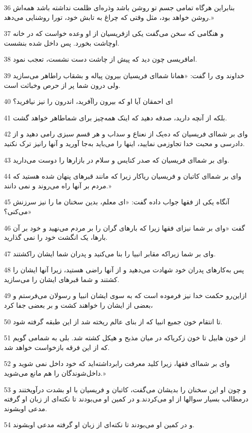 \par 36 بنابراین هرگاه تمامی جسم تو روشن باشد وذره‌ای ظلمت نداشته باشد همه‌اش روشن خواهد بود، مثل وقتی که چراغ به تابش خود، تورا روشنایی می‌دهد.»
\par 37 و هنگامی که سخن می‌گفت یکی ازفریسیان از او وعده خواست که در خانه اوچاشت بخورد. پس داخل شده بنشست.
\par 38 امافریسی چون دید که پیش از چاشت دست نشست، تعجب نمود.
\par 39 خداوند وی را گفت: «همانا شما‌ای فریسیان بیرون پیاله و بشقاب راطاهر می‌سازید ولی درون شما پر از حرص وخباثت است.
\par 40 ‌ای احمقان آیا او که بیرون راآفرید، اندرون را نیز نیافرید؟
\par 41 بلکه از آنچه دارید، صدقه دهید که اینک همه‌چیز برای شماطاهر خواهد گشت.
\par 42 وای بر شما‌ای فریسیان که ده‌یک از نعناع و سداب و هر قسم سبزی رامی دهید و از دادرسی و محبت خدا تجاوزمی نمایید، اینها را می‌باید به‌جا آورید و آنها رانیز ترک نکنید.
\par 43 وای بر شما‌ای فریسیان که صدر کنایس و سلام در بازارها را دوست می‌دارید.
\par 44 وای بر شما‌ای کاتبان و فریسیان ریاکار زیرا که مانند قبرهای پنهان شده هستید که مردم بر آنها راه می‌روند و نمی دانند.»
\par 45 آنگاه یکی از فقها جواب داده گفت: «ای معلم، بدین سخنان ما را نیز سرزنش می‌کنی؟»
\par 46 گفت «وای بر شما نیز‌ای فقها زیرا که بارهای گران را بر مردم می‌نهید و خود بر آن بارها، یک انگشت خود را نمی گذارید.
\par 47 وای بر شما زیراکه مقابر انبیا را بنا می‌کنید و پدران شما ایشان راکشتند.
\par 48 پس به‌کارهای پدران خود شهادت می‌دهید و از آنها راضی هستید، زیرا آنها ایشان را کشتند و شما قبرهای ایشان را می‌سازید.
\par 49 ازاین‌رو حکمت خدا نیز فرموده است که به سوی ایشان انبیا و رسولان می‌فرستم و بعضی از ایشان را خواهند کشت و بر بعضی جفا کرد،
\par 50 تا انتقام خون جمیع انبیا که از بنای عالم ریخته شد از این طبقه گرفته شود.
\par 51 از خون هابیل تا خون زکریاکه در میان مذبح و هیکل کشته شد. بلی به شمامی گویم که از این فرقه بازخواست خواهد شد.
\par 52 وای بر شما‌ای فقها، زیرا کلید معرفت رابرداشته‌اید که خود داخل نمی شوید و داخل‌شوندگان را هم مانع می‌شوید.»
\par 53 و چون او این سخنان را بدیشان می‌گفت، کاتبان و فریسیان با او بشدت درآویختند و درمطالب بسیار سوالها از او می‌کردند.و در کمین او می‌بودند تا نکته‌ای از زبان او گرفته مدعی اوبشوند.
\par 54 و در کمین او می‌بودند تا نکته‌ای از زبان او گرفته مدعی اوبشوند.

